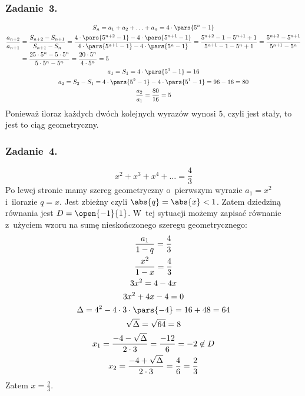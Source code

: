 \subsubsection*{Zadanie~3.}
\begin{gather*}
    S_n = a_1 + a_2 + \ldots + a_n = 4 \cdot \pars{5^n - 1}\\
    \begin{split}
        \frac{a_{n + 2}}{a_{n + 1}}
            &= \frac{S_{n + 2} - S_{n + 1}}{S_{n + 1} - S_n}
            = \frac{4 \cdot \pars{5^{n + 2} - 1} - 4 \cdot \pars{5^{n + 1} - 1}}{4 \cdot \pars{5^{n + 1} - 1} - 4 \cdot \pars{5^n - 1}}
            = \frac{5^{n + 2} - 1 - 5^{n + 1} + 1}{5^{n + 1} - 1 - 5^n + 1}
            = \frac{5^{n + 2} - 5^{n + 1}}{5^{n + 1} - 5^n}\\
            &= \frac{25 \cdot 5^n - 5 \cdot 5^n}{5 \cdot 5^n - 5^n}
            = \frac{20 \cdot 5^n}{4 \cdot 5^n}
            = 5
    \end{split}\\
    a_1 = S_1 = 4 \cdot \pars{5^1 - 1} = 16\\
    a_2 = S_2 - S_1 = 4 \cdot \pars{5^2 - 1} - 4 \cdot \pars{5^1 - 1} = 96 - 16 = 80\\
    \frac{a_2}{a_1} = \frac{80}{16} = 5
\end{gather*}
Ponieważ iloraz każdych dwóch kolejnych wyrazów wynosi \(5\), czyli jest stały, to jest to ciąg geometryczny.
\subsubsection*{Zadanie~4.}
\begin{equation*}
    x^2 + x^3 + x^4 + \ldots = \frac{4}{3}
\end{equation*}
Po lewej stronie mamy szereg geometryczny o~pierwszym wyrazie \(a_1 = x^2\) i~ilorazie \(q = x\). Jest zbieżny czyli \(\abs{q} = \abs{x} < 1\). Zatem dziedziną równania jest \(D = \open{-1}{1}\). W~tej sytuacji możemy zapisać równanie z~użyciem wzoru na sumę nieskończonego szeregu geometrycznego:
\begin{gather*}
    \frac{a_1}{1 - q} = \frac{4}{3}\\
    \frac{x^2}{1 - x} = \frac{4}{3}\\
    3x^2 = 4 - 4x\\
    3x^2 + 4x - 4 = 0\\
    \Delta = 4^2 - 4 \cdot 3 \cdot \pars{-4} = 16 + 48 = 64\\
    \sqrt{\Delta} = \sqrt{64} = 8\\
    x_1 = \frac{-4 - \sqrt{\Delta}}{2 \cdot 3} = \frac{-12}{6} = -2 \not\in D\\
    x_2 = \frac{-4 + \sqrt{\Delta}}{2 \cdot 3} = \frac{4}{6} = \frac{2}{3}
\end{gather*}
Zatem \(x = \frac{2}{3}\).
